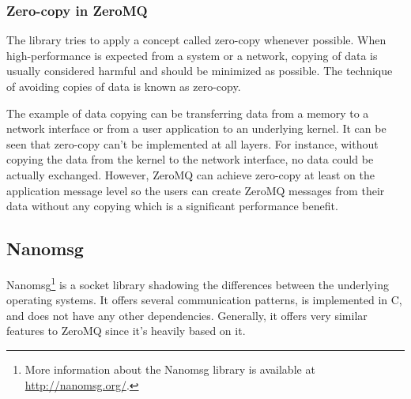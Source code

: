 \subsubsection{Zero-copy in ZeroMQ}
The library tries to apply a concept called zero-copy whenever possible. When high-performance is expected from a system or a network, copying of data is usually considered harmful and should be minimized as possible. The technique of avoiding copies of data is known as zero-copy.

The example of data copying can be transferring data from a memory to a network interface or from a user application to an underlying kernel. It can be seen that zero-copy can't be implemented at all layers. For instance, without copying the data from the kernel to the network interface, no data could be actually exchanged. However, ZeroMQ can achieve zero-copy at least on the application message level so the users can create ZeroMQ messages from their data without any copying which is a significant performance benefit.
\subsection{Nanomsg}
\label{nanomsg}
Nanomsg\footnote{More information about the Nanomsg library is available at \url{http://nanomsg.org/}.} is a socket library shadowing the differences between the underlying operating systems. It offers several communication patterns, is implemented in C, and does not have any other dependencies. Generally, it offers very similar features to ZeroMQ since it's heavily based on it.

